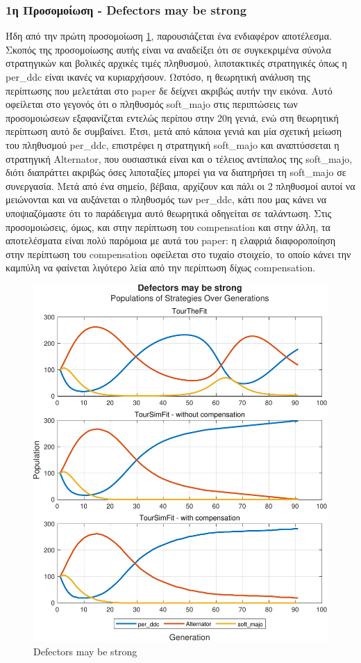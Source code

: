 \documentclass[12pt]{article}
\begin{document}
\subsubsection{1η Προσομοίωση - Defectors may be strong}
Ήδη από την πρώτη προσομοίωση \ref{fig:Defectors may be strong}, παρουσιάζεται ένα ενδιαφέρον αποτέλεσμα. Σκοπός της προσομοίωσης αυτής είναι να αναδείξει ότι σε συγκεκριμένα σύνολα στρατηγικών και βολικές αρχικές τιμές πληθυσμού, λιποτακτικές στρατηγικές όπως η per\_ddc είναι ικανές να κυριαρχήσουν. Ωστόσο, η θεωρητική ανάλυση της περίπτωσης που μελετάται στο paper δε δείχνει ακριβώς αυτήν την εικόνα. Αυτό οφείλεται στο γεγονός ότι ο πληθυσμός soft\_majo στις περιπτώσεις των προσομοιώσεων εξαφανίζεται εντελώς περίπου στην 20η γενιά, ενώ στη θεωρητική περίπτωση αυτό δε συμβαίνει. Έτσι, μετά από κάποια γενιά και μία σχετική μείωση του πληθυσμού per\_ddc, επιστρέφει η στρατηγική soft\_majo και αναπτύσσεται η στρατηγική Alternator, που ουσιαστικά είναι και ο τέλειος αντίπαλος της soft\_majo, διότι διαπράττει ακριβώς όσες λιποταξίες μπορεί για να διατηρήσει τη soft\_majo σε συνεργασία. Μετά από ένα σημείο, βέβαια, αρχίζουν και πάλι οι 2 πληθυσμοί αυτοί να μειώνονται και να αυξάνεται ο πληθυσμός των per\_ddc, κάτι που μας κάνει να υποψιαζόμαστε ότι το παράδειγμα αυτό θεωρητικά οδηγείται σε ταλάντωση. Στις προσομοιώσεις, όμως, και στην περίπτωση του compensation και στην άλλη, τα αποτελέσματα είναι πολύ παρόμοια με αυτά του paper: η ελαφριά διαφοροποίηση στην περίπτωση του compensation οφείλεται στο τυχαίο στοιχείο, το οποίο κάνει την καμπύλη να φαίνεται λιγότερο λεία από την περίπτωση δίχως compensation.
	\begin{figure}[h]
	      \centering
	      \includegraphics[scale=0.8]{Defectors may be strong.pdf}
	      \caption{Defectors may be strong}
	      \label{fig:Defectors may be strong}
	\end{figure}
\end{document}
